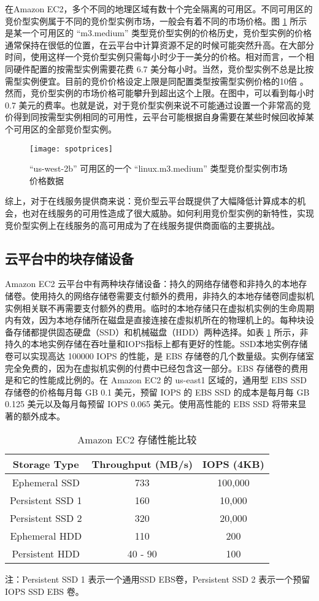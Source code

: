 在Amazon EC2，多个不同的地理区域有数十个完全隔离的可用区。不同可用区的竞价型实例属于不同的竞价型实例市场，一般会有着不同的市场价格。图 \ref{figure:sp} 所示是某一个可用区的 ``m3.medium'' 类型竞价型实例的价格历史，竞价型实例的价格通常保持在很低的位置，在云平台中计算资源不足的时候可能突然升高。在大部分时间，使用这样一个竞价型实例只需每小时少于一美分的价格。相对而言，一个相同硬件配置的按需型实例需要花费 6.7 美分每小时。当然，竞价型实例不总是比按需型实例便宜。目前的竞价价格设定上限是同配置类型按需型实例价格的10倍 \cite{AWS_SL:2014}。然而，竞价型实例的市场价格可能攀升到超出这个上限。在图中，可以看到每小时 0.7 美元的费率。也就是说，对于竞价型实例来说不可能通过设置一个非常高的竞价得到同按需型实例相同的可用性，云平台可能根据自身需要在某些时候回收掉某个可用区的全部竞价型实例。
\begin{figure}[]
  \centering
  \texttt{[image: spotprices]}
  \caption{``us-west-2b'' 可用区的一个 ``linux.m3.medium'' 类型竞价型实例市场价格数据}
  \label{figure:sp}
\end{figure}

综上，对于在线服务提供商来说：竞价型云平台既提供了大幅降低计算成本的机会，也对在线服务的可用性造成了很大威胁。如何利用竞价型实例的新特性，实现竞价型实例上在线服务的高可用成为了在线服务提供商面临的主要挑战。

\subsection{云平台中的块存储设备}
Amazon EC2 云平台中有两种块存储设备：持久的网络存储卷和非持久的本地存储卷。使用持久的网络存储卷需要支付额外的费用，非持久的本地存储卷同虚拟机实例相关联不再需要支付额外的费用。临时的本地存储只在虚拟机实例的生命周期内有效，因为本地存储所在磁盘是直接连接在虚拟机所在的物理机上的。每种块设备存储都提供固态硬盘（SSD）和机械磁盘（HDD）两种选择。如表 \ref{table:ec2storage} 所示，非持久的本地实例存储在吞吐量和IOPS指标上都有更好的性能。SSD本地实例存储卷可以实现高达 100000 IOPS 的性能，是 EBS 存储卷的几个数量级。实例存储室完全免费的，因为在虚拟机实例的付费中已经包含这一部分。EBS 存储卷的费用是和它的性能成比例的。在 Amazon EC2 的 us-east1 区域的，通用型 EBS SSD 存储卷的价格每月每 GB 0.1 美元，预留 IOPS 的 EBS SSD 的成本是每月每 GB 0.125 美元以及每月每预留 IOPS 0.065 美元。使用高性能的 EBS SSD 将带来显著的额外成本。
\begin{table}
\centering
\begin{threeparttable}
\caption{Amazon EC2 存储性能比较}
\label{table:ec2storage}
\begin{tabular}{c|c|c} \hline
Storage Type& Throughput (MB/s)& IOPS (4KB)\\
\hline
Ephemeral SSD & 733 & 100,000\\
Persistent SSD 1 & 160 & 10,000\\
Persistent SSD 2 & 320 & 20,000\\
Ephemeral HDD & 110 & 200 \\
Persistent HDD & 40 - 90 & 100\\
\hline
\end{tabular}
\small 注：Persistent SSD 1 表示一个通用SSD EBS卷，Persistent SSD 2 表示一个预留 IOPS SSD EBS 卷。 
\end{threeparttable}
\end{table}

